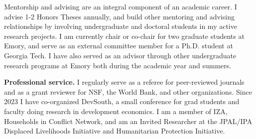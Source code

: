 \documentclass[10pt, letter]{article}
\begin{document}
Mentorship and advising are an integral component of an academic career. I advise 1-2 Honors Theses annually, and build other mentoring and advising relationships by involving undergraduate and doctoral students in my active research projects. I am currently chair or co-chair for two graduate students at Emory, and serve as an external committee member for a Ph.D. student at Georgia Tech. I have also served as an advisor through other undergraduate research programs at Emory both during the academic year and summers.



\noindent \textbf{Professional service.}
I regularly serve as a referee for peer-reviewed journals and as a grant reviewer for NSF, the World Bank, and other organizations. Since 2023 I have co-organized DevSouth, a small conference for grad students and faculty doing research in development economics. I am a member of IZA, Households in Conflict Network, and am an Invited Researcher at the JPAL/IPA Displaced Livelihoods Initiative and Humanitarian Protection Initiative.


\clearpage




\printbibliography
\end{document}
